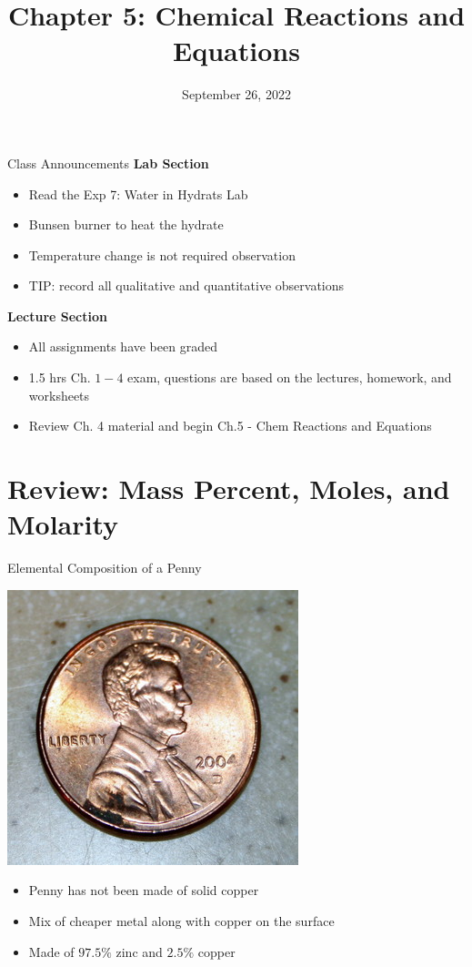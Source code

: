 \documentclass[11pt]{beamer}
\title{Chapter 5: Chemical Reactions and Equations}
\institute{Chemistry Department, Cypress College}
\date{September 26, 2022}
\begin{document}
\begin{frame}
  \titlepage
\end{frame}

\begin{frame}{Class Announcements}
  \textbf{Lab Section}
  \begin{itemize}
  \item Read the Exp 7: Water in Hydrats Lab
  \item Bunsen burner to heat the hydrate
  \item Temperature change is not required observation
  \item TIP: record all qualitative and quantitative observations
  \end{itemize}

  \textbf{Lecture Section}
  \begin{itemize}
  \item All assignments have been graded
  \item 1.5 hrs Ch. $1 - 4$ exam, questions are based on the lectures,
    homework, and worksheets
  \item Review Ch. 4 material and begin Ch.5 - Chem Reactions and Equations
  \end{itemize}
\end{frame}

\section{Review: Mass Percent, Moles, and Molarity}

\begin{frame}{Elemental Composition of a Penny}
  \begin{center}
    \includegraphics[scale=0.3]{penny_2004}
  \end{center}

  \begin{itemize}
  \item Penny has not been made of solid copper
  \item Mix of cheaper metal along with copper on the surface
  \item Made of $97.5\%$ zinc and $2.5\%$ copper
  \end{itemize}
\end{frame}
\end{document}
